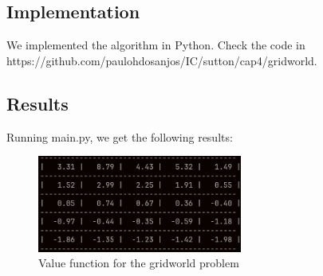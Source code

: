 \documentclass[11pt]{article}
\begin{document}
\subsection{Implementation}
We implemented the algorithm in Python. Check the code in https://github.com/paulohdosanjos/IC/sutton/cap4/gridworld.

\subsection{Results}
Running main.py, we get the following results:

\begin{figure}[h]
  \begin{center}
    \includegraphics[width=0.6\textwidth]{../src/img/results.png}
  \end{center}
  \caption{Value function for the gridworld problem}
  \label{fig:}
\end{figure}
\end{document}
